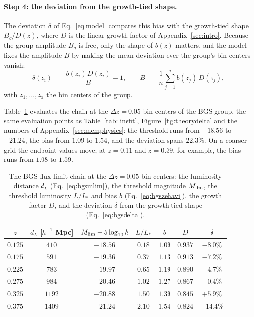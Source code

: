 \documentclass[11pt]{article}
\begin{document}
\paragraph{Step 4: the deviation from the growth-tied shape.}
The deviation $\delta$ of Eq.~\eqref{eq:model} compares this bias
with the growth-tied shape $B_g/D(z)$, where $D$ is the linear growth
factor of Appendix~\ref{sec:intro}.  Because the group amplitude
$B_g$ is free, only the shape of $b(z)$ matters, and the model fixes
the amplitude $B$ by making the mean deviation over the group's bin
centers vanish:
\begin{equation}
  \delta(z_i)
  \;=\;
  \frac{b(z_i)\,D(z_i)}{B} - 1,
  \qquad
  B \;=\; \frac{1}{n}\sum_{j=1}^{n} b(z_j)\,D(z_j),
  \label{eq:bgsdelta}
\end{equation}
with $z_1, \dots, z_n$ the bin centers of the group.

Table~\ref{tab:bgsflux} evaluates the chain at the
$\Delta z = 0.05$ bin centers of the BGS group, the same evaluation
points as Table~\ref{tab:linefit}, Figure~\ref{fig:theorydelta} and
the numbers of Appendix~\ref{sec:memphysics}: the threshold runs from
$-18.56$ to $-21.24$, the bias from $1.09$ to $1.54$, and the
deviation spans $22.3\%$.  On a coarser grid the endpoint values
move; at $z = 0.11$ and $z = 0.39$, for example, the bias runs from
$1.08$ to $1.59$.

\begin{table}[ht]
  \centering
  \begin{tabular}{ccccccc}
    \hline
    $z$ & $d_L$ [$h^{-1}$ Mpc] & $M_{\rm lim} - 5\log_{10} h$ &
    $L/L_*$ & $b$ & $D$ & $\delta$ \\
    \hline
    $0.125$ & $410$  & $-18.56$ & $0.18$ & $1.09$ & $0.937$ & $-8.0\%$ \\
    $0.175$ & $591$  & $-19.36$ & $0.37$ & $1.13$ & $0.913$ & $-7.2\%$ \\
    $0.225$ & $783$  & $-19.97$ & $0.65$ & $1.19$ & $0.890$ & $-4.7\%$ \\
    $0.275$ & $984$  & $-20.46$ & $1.02$ & $1.27$ & $0.867$ & $-0.4\%$ \\
    $0.325$ & $1192$ & $-20.88$ & $1.50$ & $1.39$ & $0.845$ & $+5.9\%$ \\
    $0.375$ & $1409$ & $-21.24$ & $2.10$ & $1.54$ & $0.824$ & $+14.4\%$ \\
    \hline
  \end{tabular}
  \caption{The BGS flux-limit chain at the $\Delta z = 0.05$ bin
    centers: the luminosity distance $d_L$
    (Eq.~\eqref{eq:bgsmlim}), the threshold magnitude
    $M_{\rm lim}$, the threshold luminosity $L/L_*$ and bias $b$
    (Eq.~\eqref{eq:bgszehavi}), the growth factor $D$, and the
    deviation $\delta$ from the growth-tied shape
    (Eq.~\eqref{eq:bgsdelta}).}
  \label{tab:bgsflux}
\end{table}
\end{document}
